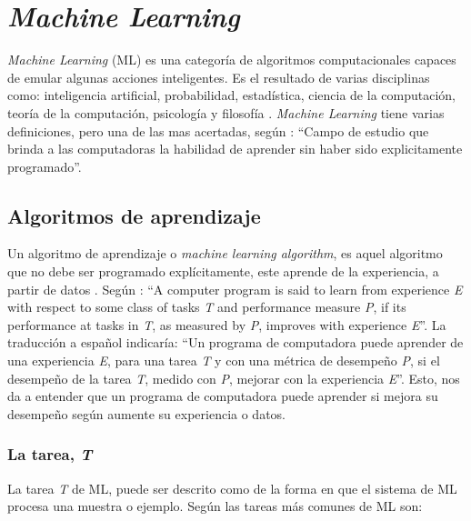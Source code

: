 \section{\textit{Machine Learning}}

\textit{Machine Learning} (ML) es una categoría de algoritmos computacionales capaces de emular algunas acciones inteligentes. Es el resultado de varias disciplinas como: inteligencia artificial, probabilidad, estadística, ciencia de la computación, teoría de la computación, psicología y filosofía \citep{el2022machine}. \textit{Machine Learning}  tiene varias definiciones, pero una de las mas acertadas, según \cite{samuel1967some}: ``Campo de estudio que brinda a las computadoras la habilidad de aprender sin haber sido explicitamente programado''. \\





\subsection{Algoritmos de aprendizaje}

Un algoritmo de aprendizaje o \textit{machine learning algorithm}, es aquel algoritmo que no debe ser programado explícitamente, este aprende de la experiencia, a partir de datos \citep{Goodfellow2016}.  Según \cite{mitchell1997machine}: ``A computer program is said to learn from experience \textit{E} with respect to some class of tasks \textit{T} and performance measure \textit{P}, if its performance at tasks in \textit{T}, as measured by \textit{P}, improves with experience \textit{E}''. La traducción a español indicaría: ``Un programa de computadora puede aprender de una experiencia \textit{E}, para una tarea \textit{T} y con una métrica de desempeño \textit{P}, si el desempeño de la tarea \textit{T}, medido con \textit{P}, mejorar con la experiencia \textit{E}''. Esto, nos da a entender que un programa de computadora puede aprender si mejora su desempeño según aumente su experiencia o datos.



\subsubsection{La tarea, \textit{T}}

La tarea \textit{T} de ML, puede ser descrito como de la forma en que el sistema de ML procesa una muestra o ejemplo. Según \cite{Goodfellow2016} las tareas más comunes de ML son:

